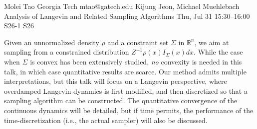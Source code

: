 \documentclass[12pt,lettersize,oneside]{book} %
\begin{document}
\begin{talk}
  {Molei Tao}%
  {Georgia Tech}%
  {mtao@gatech.edu}%
  {Kijung Jeon, Michael Muehlebach}%
  {Analysis of Langevin and Related Sampling Algorithms}%
  {}%
  {Thu, Jul 31 15:30--16:00}%
  {S26-1}%
  {S26}%
    

Given an unnormalized density $\rho$ and a constraint set $\Sigma$ in $\mathbb{R}^n$, we aim at sampling from a constrained distribution $Z^{-1} \rho(x) I_{\Sigma}(x) dx$. While the case when $\Sigma$ is convex has been extensively studied, \emph{no} convexity is needed in this talk, in which case quantitative results are scarce. %
Our method admits multiple interpretations, but this talk will focus on a Langevin perspective, where overdamped Langevin dynamics is first modified, and then discretized so that a sampling algorithm can be constructed. The quantitative convergence of the continuous dynamics will be detailed, but if time permits, the performance of the time-discretization (i.e., the actual sampler) will also be discussed.





\end{talk}
\end{document}

